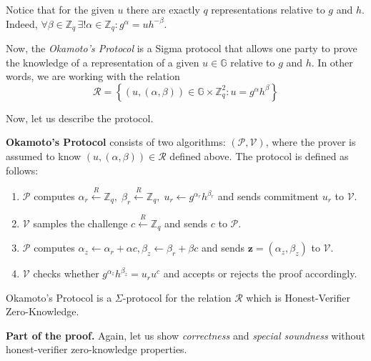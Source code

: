 \documentclass[../lecture-notes.tex]{subfiles}
\begin{document}
\begin{remark}
    Notice that for the given $u$ there are exactly $q$ representations relative to $g$ and $h$. Indeed, $\forall \beta \in \mathbb{Z}_q \, \exists! \alpha \in \mathbb{Z}_q: g^{\alpha} = uh^{-\beta}$. 
\end{remark}

Now, the \textit{Okamoto's Protocol} is a Sigma protocol that allows one party to prove the knowledge of a representation of a given $u \in \mathbb{G}$ relative to $g$ and $h$. In other words, we are working with the relation
\begin{equation*}
    \mathcal{R} = \left\{ (u,(\alpha,\beta)) \in \mathbb{G} \times \mathbb{Z}_q^2: u = g^{\alpha}h^{\beta} \right\}
\end{equation*}

Now, let us describe the protocol.

\begin{definition}
    \textbf{Okamoto's Protocol} consists of two algorithms: $(\mathcal{P}, \mathcal{V})$, where the prover is assumed to know $(u,(\alpha,\beta)) \in \mathcal{R}$ defined above. The protocol is defined as follows:
    \begin{enumerate}
        \item $\mathcal{P}$ computes $\alpha_r \xleftarrow{R} \mathbb{Z}_q, \; \beta_r \xleftarrow{R} \mathbb{Z}_q, \; u_r \gets g^{\alpha_r}h^{\beta_r}$ and sends commitment $u_r$ to $\mathcal{V}$.
        \item $\mathcal{V}$ samples the challenge $c \xleftarrow{R} \mathbb{Z}_q$ and sends $c$ to $\mathcal{P}$.
        \item $\mathcal{P}$ computes $\alpha_z \gets \alpha_r + \alpha c, \beta_z \gets \beta_r + \beta c$ and sends $\mathbf{z} = (\alpha_z,\beta_z)$ to $\mathcal{V}$.
        \item $\mathcal{V}$ checks whether $g^{\alpha_z}h^{\beta_z} = u_r u^c$ and accepts or rejects the proof accordingly.
    \end{enumerate}
\end{definition}

\begin{theorem}
    Okamoto's Protocol is a $\Sigma$-protocol for the relation $\mathcal{R}$ which is Honest-Verifier Zero-Knowledge.
\end{theorem}

\textbf{Part of the proof.} Again, let us show \textit{correctness} and \textit{special soundness} without honest-verifier zero-knowledge properties.
\end{document}
